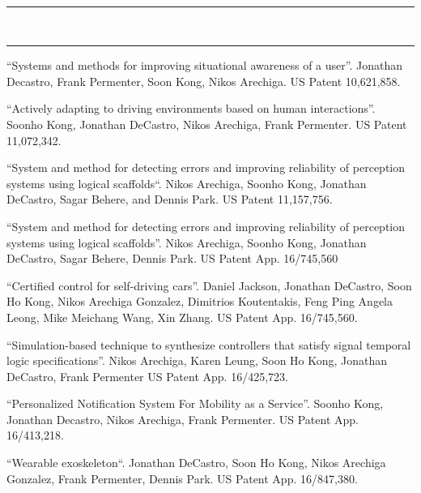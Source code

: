 \documentclass[10pt, letterpaper]{article}
\newcommand{\interval}[2]
{#1 -- \makebox[1.5cm]{\hfill#2}}
\newcommand{\amper}{{\fontspec[Scale=.95]{Adobe Caslon Pro}\selectfont\itshape\&}\xspace}
\newcommand{\mysection}[1]{
  \vspace{20pt}\noindent{\rmfamily\mdseries \Large #1}\\
  \vspace{-6pt}\hrule\vspace{3pt}
}
\begin{document}
\mysection{Publications}


\nocite{*}
\printbibliography[heading=none]

\mysection{Patents}

\begin{thebibliography}{9}

 ``Systems and methods for improving situational awareness of a user''.
Jonathan Decastro, Frank Permenter, Soon Kong, Nikos Arechiga.
US Patent 10,621,858.

 ``Actively adapting to driving environments based on human interactions''.
Soonho Kong, Jonathan DeCastro, Nikos Arechiga, Frank Permenter.
US Patent 11,072,342.

 ``System and method for detecting errors and improving reliability of perception systems using logical scaffolds``.
Nikos Arechiga, Soonho Kong, Jonathan DeCastro, Sagar Behere, and Dennis Park.
US Patent 11,157,756.

 ``System and method for detecting errors and improving reliability of perception systems using logical scaffolds''.
  Nikos Arechiga, Soonho Kong, Jonathan DeCastro, Sagar Behere, Dennis Park.
  US Patent App. 16/745,560

 ``Certified control for self-driving cars''.
  Daniel Jackson, Jonathan DeCastro, Soon Ho Kong, Nikos Arechiga Gonzalez, Dimitrios Koutentakis, Feng Ping Angela Leong, Mike Meichang Wang, Xin Zhang.
  US Patent App. 16/745,560.

 ``Simulation-based technique to synthesize controllers that satisfy signal temporal logic specifications''.
Nikos Arechiga, Karen Leung, Soon Ho Kong, Jonathan DeCastro, Frank Permenter
US Patent App. 16/425,723.

 ``Personalized Notification System For Mobility as a Service''.
Soonho Kong, Jonathan Decastro, Nikos Arechiga, Frank Permenter.
US Patent App. 16/413,218.

 ``Wearable exoskeleton``.
Jonathan DeCastro, Soon Ho Kong, Nikos Arechiga Gonzalez, Frank Permenter, Dennis Park.
US Patent App. 16/847,380.

\end{thebibliography}


\end{document}
